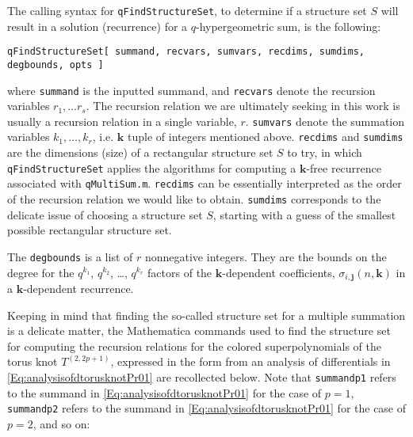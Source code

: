 \documentclass[a4paper,titlepage,twoside]{book}
\begin{document}
\begin{appendix}
The calling syntax for \texttt{qFindStructureSet}, to determine if a structure set $S$ will result in a solution (recurrence) for a $q$-hypergeometric sum, is the following:
\begin{verbatim}
qFindStructureSet[ summand, recvars, sumvars, recdims, sumdims, degbounds, opts ]
\end{verbatim}
where \texttt{summand} is the inputted summand, and \texttt{recvars} denote the recursion variables $r_1, \dots r_s$.  The recursion relation we are ultimately seeking in this work is usually a recursion relation in a single variable, $r$.  \texttt{sumvars} denote the summation variables $k_1, \dots , k_r$, i.e. $\mathbf{k}$ tuple of integers mentioned above.  \texttt{recdims} and \texttt{sumdims} are the dimensions (size) of a rectangular structure set $S$ to try, in which \texttt{qFindStructureSet} applies the algorithms for computing a $\mathbf{k}$-free recurrence associated with \texttt{qMultiSum.m}.  \texttt{recdims} can be essentially interpreted as the order of the recursion relation we would like to obtain.  \texttt{sumdims} corresponds to the delicate issue of choosing a structure set $S$, starting with a guess of the smallest possible rectangular structure set.  

The \texttt{degbounds} is a list of $r$ nonnegative integers.  They are the bounds on the degree for the $q^{k_1}$, $q^{k_2}$, \dots , $q^{k_r}$ factors of the $\mathbf{k}$-dependent coefficients, $\sigma_{i,\mathbf{j}}{ (n,\mathbf{k})}$ in a $\mathbf{k}$-dependent recurrence.  

Keeping in mind that finding the so-called structure set for a multiple summation is a delicate matter, the Mathematica commands used to find the structure set for computing the recursion relations for the colored superpolynomials of the torus knot $T^{(2,2p+1)}$, expressed in the form from an analysis of differentials in \eqref{Eq:analysisofdtorusknotPr01} are recollected below.  Note that \texttt{summandp1} refers to the summand in \eqref{Eq:analysisofdtorusknotPr01} for the case of $p=1$, \texttt{summandp2} refers to the summand in \eqref{Eq:analysisofdtorusknotPr01} for the case of $p=2$, and so on:


\end{appendix}
\end{document}
